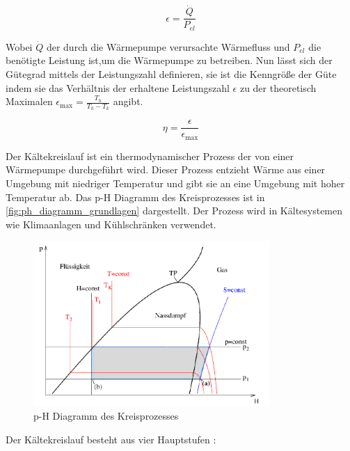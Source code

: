 \documentclass[12pt,english,ngerman]{scrartcl}
\begin{document}
\begin{equation}
	\epsilon = \frac{\dot{Q}}{P_{el}}
	\label{eq:Leistungszahl}
\end{equation}

Wobei $\dot{Q}$ der durch die Wärmepumpe verursachte Wärmefluss und $P_{el}$
die benötigte Leistung ist,um die Wärmepumpe zu betreiben. Nun lässt sich der
Gütegrad mittels der Leistungszahl definieren, sie ist die Kenngröße der Güte
indem sie das Verhältnis der erhaltene Leistungszahl $\epsilon$ zu der
theoretisch Maximalen $\epsilon_\text{max} = \frac{T_h}{T_h-T_k}$ angibt.

\begin{equation}
	\eta = \frac{\epsilon}{\epsilon_\text{max}}
	\label{eq:guetefaktor}
\end{equation}

Der Kältekreislauf ist ein thermodynamischer Prozess der von einer Wärmepumpe
durchgeführt wird. Dieser Prozess entzieht Wärme aus einer Umgebung mit
niedriger Temperatur und gibt sie an eine Umgebung mit hoher Temperatur ab. Das
p-H Diagramm des Kreisprozesses ist in \autoref{fig:ph_diagramm_grundlagen}
dargestellt. Der Prozess wird in Kältesystemen wie Klimaanlagen und
Kühlschränken verwendet.

\begin{figure}[H]
	\begin{center}
		\includegraphics[width =0.8\textwidth]{./figures/ph_diagramm_grundlagen.PNG}
	\end{center}
	\caption[p-H Diagramm des Kreisprozesses]{p-H Diagramm des Kreisprozesses
		\cite{hohenau_warmepumpe_2014}
	}\label{fig:ph_diagramm_grundlagen}
\end{figure}

Der Kältekreislauf besteht aus vier Hauptstufen \cite{hohenau_warmepumpe_2014}:
\end{document}
